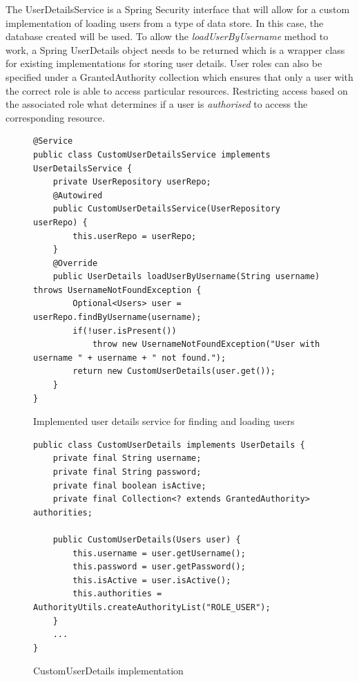 The UserDetailsService is a Spring Security interface that will allow for a custom implementation of loading users from a type of data store.
In this case, the database created will be used.
To allow the \textit{loadUserByUsername} method to work, a Spring UserDetails object needs to be returned which is a wrapper class for
existing implementations for storing user details.
User roles can also be specified under a GrantedAuthority collection which ensures that only a user with the correct role is able to 
access particular resources.
Restricting access based on the associated role what determines if a user is \textit{authorised} to access the corresponding resource.

\clearpage
\begin{figure}[ht]
    \centering
    \begin{lstlisting}
@Service
public class CustomUserDetailsService implements UserDetailsService {
    private UserRepository userRepo;
    @Autowired
    public CustomUserDetailsService(UserRepository userRepo) {
        this.userRepo = userRepo;
    }
    @Override
    public UserDetails loadUserByUsername(String username) throws UsernameNotFoundException {
        Optional<Users> user = userRepo.findByUsername(username);
        if(!user.isPresent())
            throw new UsernameNotFoundException("User with username " + username + " not found.");
        return new CustomUserDetails(user.get());
    }
}
    \end{lstlisting}
    \caption{Implemented user details service for finding and loading users}
    \label{userdetailsservice}
\end{figure}

\begin{figure}[ht]
    \centering
    \begin{lstlisting}
public class CustomUserDetails implements UserDetails {
    private final String username;
    private final String password;
    private final boolean isActive;
    private final Collection<? extends GrantedAuthority> authorities;

    public CustomUserDetails(Users user) {
        this.username = user.getUsername();
        this.password = user.getPassword();
        this.isActive = user.isActive();
        this.authorities = AuthorityUtils.createAuthorityList("ROLE_USER");
    }
    ...
}
    \end{lstlisting}
    \caption{CustomUserDetails implementation}
    \label{userdetailswrapper}
\end{figure}


